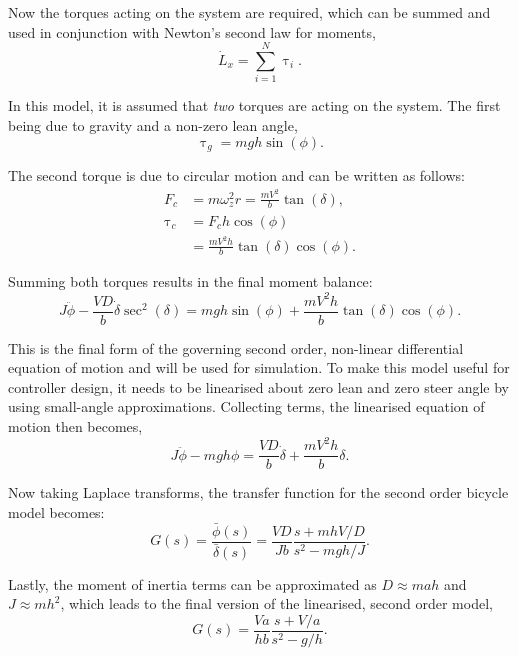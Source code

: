 Now the torques acting on the system are required, which can be summed and used in conjunction with Newton's second law for moments,
\begin{equation*}
\dot{L}_x = \sum_{i=1}^N{\uptau_i}.
\end{equation*}

In this model, it is assumed that \textit{two} torques are acting on the system. The first being due to gravity and a non-zero lean angle,
\begin{equation*}
\uptau_{g} = m g h \sin{(\phi)}.
\end{equation*}

The second torque is due to circular motion and can be written as follows:
\begin{align*}
F_c &= m \omega^2_z r = \frac{m V^2}{b} \tan{(\delta)}, \\
\uptau_c &= F_c h \cos{(\phi)} \\
&= \frac{m V^2 h}{b} \tan{(\delta)} \cos{(\phi)}.
\end{align*}

Summing both torques results in the final moment balance:
\begin{equation}
J \ddot{\phi} - \frac{V D}{b} \dot{\delta} \sec^2{(\delta)} = m g h \sin{(\phi)} + \frac{m V^2 h}{b} \tan{(\delta)} \cos{(\phi)}.
\label{eq:2ndOrderNL}
\end{equation}

This is the final form of the governing second order, non-linear differential equation of motion and will be used for simulation. To make this model useful for controller design, it needs to be linearised about zero lean and zero steer angle by using small-angle approximations. Collecting terms, the linearised equation of motion then becomes,
\begin{equation*}
J \ddot{\phi} - m g h \phi = \frac{V D}{b} \dot{\delta} + \frac{m V^2 h}{b} \delta.
\end{equation*}

Now taking Laplace transforms, the transfer function for the second order bicycle model becomes:
\begin{equation*}
G(s) = \frac{\bar{\phi}(s)}{\bar{\delta}(s)} =  \frac{V D}{J b} \frac{s + m h V / D}{s^2 - m g h / J}.
\end{equation*}

Lastly, the moment of inertia terms can be approximated as $D \approx m a h$ and $J \approx m h^2$, which leads to the final version of the linearised, second order model,
\begin{equation}
G(s) = \frac{V a}{h b} \frac{s + V/a}{s^2 - g/h}.
\label{eq:2ndOrder}
\end{equation}

